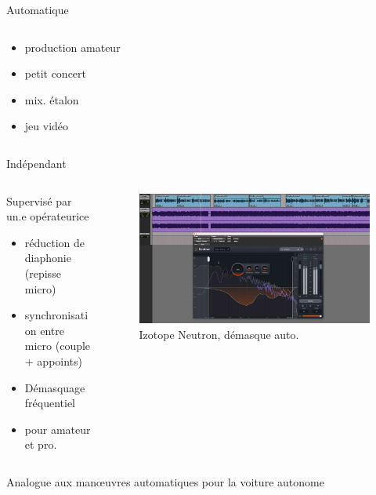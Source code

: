 \documentclass[9pt, aspectratio=169]{beamer}
\begin{document}
\begin{frame}{Automatique} %
\begin{columns}
    \begin{column}{0.48\textwidth}
		\begin{itemize}
			\item production amateur
			\item petit concert
			\item mix. étalon
			\item jeu vidéo \cite{schmidt_interactive_2003}
		\end{itemize}
    \end{column}
    \begin{column}{0.48\textwidth}
    \end{column}
\end{columns}
\end{frame}

\begin{frame}{Indépendant} %
\begin{columns}

    \begin{column}{0.48\textwidth}
	    Supervisé par un.e opérateurice
		\begin{itemize}
			\item réduction de diaphonie (repisse micro)
			\item synchronisation entre micro (couple + appoints)
			\item Démasquage fréquentiel \cite{wichern_comparison_2015}
			\item pour amateur et pro.
		\end{itemize}
    \end{column}
    \begin{column}{0.48\textwidth}
		\begin{figure}
			\includegraphics[width=\textwidth]{fig/neutron_unmask.jpg}
			\caption{Izotope Neutron, démasque auto.}
		\end{figure}
    \end{column}
\end{columns}
Analogue aux manœuvres automatiques pour la voiture autonome
\end{frame}
\end{document}
